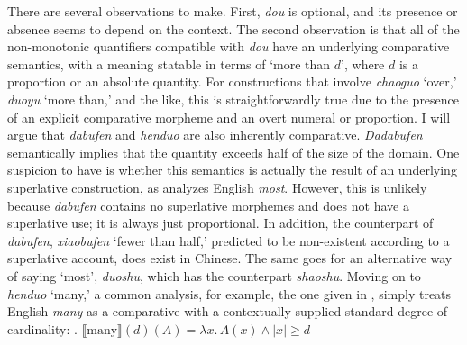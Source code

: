 \documentclass[12pt]{article}
\begin{document}
There are several observations to make.
First, \emph{dou} is optional, and its presence or absence seems to depend on the context.
%
The second observation is that all of the non-monotonic quantifiers compatible with \emph{dou} have an underlying comparative semantics, with a meaning statable in terms of `more than \(d\)', where \(d\) is a proportion or an absolute quantity.
For constructions that involve \emph{chaoguo} `over,' \emph{duoyu} `more than,' and the like, this is straightforwardly true due to the presence of an explicit comparative morpheme and an overt numeral or proportion.
I will argue that \emph{dabufen} and \emph{henduo} are also inherently comparative.
\emph{Dadabufen} semantically implies that the quantity exceeds half of the size of the domain.
One suspicion to have is whether this semantics is actually the result of an underlying superlative construction, as \citet{hacklGrammarProcessingProportional2009a} analyzes English \emph{most}.
However, this is unlikely because \emph{dabufen} contains no superlative morphemes and does not have a superlative use; it is always just proportional.
In addition, the counterpart of \emph{dabufen}, \emph{xiaobufen} `fewer than half,' predicted to be non-existent according to a superlative account, does exist in Chinese.
The same goes for an alternative way of saying `most', \emph{duoshu}, which has the counterpart \emph{shaoshu}.
Moving on to \emph{henduo} `many,' a common analysis, for example, the one given in \citet{hacklGrammarProcessingProportional2009a}, simply treats English \emph{many} as a comparative with a contextually supplied standard degree of cardinality:
\ex. \(\llbracket \text{many} \rrbracket(d)(A) = \lambda x.\, A(x) \land \lvert x \rvert \geq d\)
\end{document}
